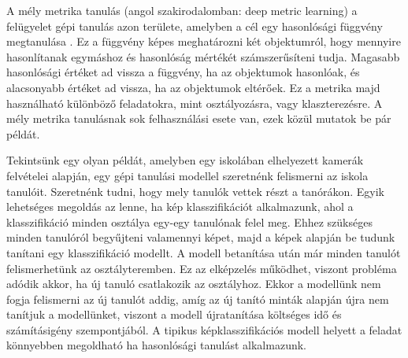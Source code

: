
A mély metrika tanulás (angol szakirodalomban: deep metric learning) a felügyelet gépi tanulás azon területe, amelyben a cél egy hasonlósági függvény megtanulása \cite{kaya2019dmlsurvey}. Ez a függvény képes meghatározni két objektumról, hogy mennyire hasonlítanak egymáshoz és hasonlóság mértékét számszerűsíteni tudja. Magasabb hasonlósági értéket ad vissza a függvény, ha az objektumok hasonlóak, és alacsonyabb értéket ad vissza, ha az objektumok eltérőek. Ez a metrika majd használható különböző feladatokra, mint osztályozásra, vagy klaszterezésre. A mély metrika tanulásnak sok felhasználási esete van, ezek közül mutatok be pár példát.


Tekintsünk egy olyan példát, amelyben egy iskolában elhelyezett kamerák felvételei alapján, egy gépi tanulási modellel szeretnénk felismerni az iskola tanulóit. Szeretnénk tudni, hogy mely tanulók vettek részt a tanórákon. Egyik lehetséges megoldás az lenne, ha kép klasszifikációt alkalmazunk, ahol a klasszifikáció minden osztálya egy-egy tanulónak felel meg. Ehhez szükséges minden tanulóról begyűjteni valamennyi képet, majd a képek alapján be tudunk tanítani egy klasszifikáció modellt. A modell betanítása után már minden tanulót felismerhetünk az osztályteremben. Ez az elképzelés működhet, viszont probléma adódik akkor, ha új tanuló csatlakozik az osztályhoz. Ekkor a modellünk nem fogja felismerni az új tanulót addig, amíg az új tanító minták alapján újra nem tanítjuk a modellünket, viszont a modell újratanítása költséges idő és számításigény szempontjából. A tipikus képklasszifikációs modell helyett a feladat könnyebben megoldható ha hasonlósági tanulást alkalmazunk.


